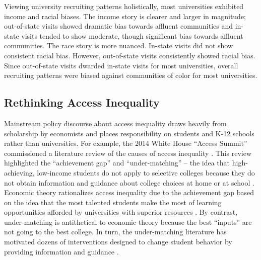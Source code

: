 \documentclass[twoside]{article}
\begin{document}
Viewing university recruiting patterns holistically, most universities exhibited income and racial biases. The income story is clearer and larger in magnitude; out-of-state visits showed dramatic bias towards affluent communities and in-state visits tended to show moderate, though significant bias towards affluent communities. The race story is more nuanced. In-state visits did not show consistent racial bias. However, out-of-state visits consistently showed racial bias. Since out-of-state visits dwarded in-state visits for most universities, overall recruiting patterns were biased against communities of color for most universities.

\subsection*{Rethinking Access Inequality}

Mainstream policy discourse about access inequality draws heavily from scholarship by economists and places responsibility on students and K-12 schools rather than universities. For example, the 2014 White House ``Access Summit'' commissioned a literature review of the causes of access inequality \citep{RN4016}.  This review highlighted the ``achievement gap'' and ``under-matching'' -- the idea that high-achieving, low-income students do not apply to selective colleges because they do not obtain information and guidance about college choices at home or at school \citep{RN3699,RN3700}.  Economic theory rationalizes access inequality due to the achievement gap based on the idea that the most talented students make the most of learning opportunities afforded by universities with superior resources \citep{RN1549,RN2247,RN2402,RN1545}. By contrast, under-matching is antithetical to economic theory because the best ``inputs'' are not going to the best college. In turn, the under-matching literature has motivated dozens of interventions designed to change student behavior by providing information and guidance \citep[e.g., ][]{RN4352,RN4345,RN4351}.
\end{document}
